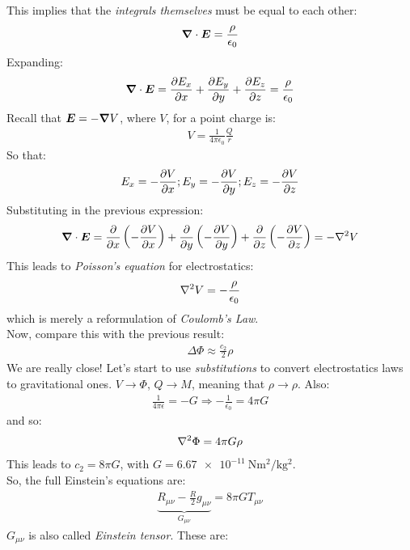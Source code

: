\documentclass[../template.tex]{subfiles}
\begin{document}
This implies that the \textit{integrals themselves} must be equal to each other:
\begin{align*}
    \vnabla \cdot \bm{E} = \frac{\rho}{\epsilon_0} 
\end{align*}
Expanding:
\begin{align*}
    \vnabla \cdot \bm{E} = \pdv{E_x}{x} + \pdv{E_y}{y} + \pdv{E_z}{z} = \frac{\rho}{\epsilon_0} 
\end{align*}
Recall that $\bm{E} = -\vnabla V$, where $V$, for a point charge is:
\begin{align*}
    V = \frac{1}{4 \pi \epsilon_0} \frac{Q}{r}  
\end{align*}  
So that:
\begin{align*}
    E_x = -\pdv{V}{x}; E_y=-\pdv{V}{y}; E_z = -\pdv{V}{z}
\end{align*}
Substituting in the previous expression:
\begin{align*}
    \vnabla \cdot \bm{E} = \pdv{x}\left(-\pdv{V}{x}\right)  + \pdv{y}\left(-\pdv{V}{y}\right) + \pdv{z}\left(-\pdv{V}{z}\right) = -\laplacian V
\end{align*}
This leads to \textit{Poisson's equation} for electrostatics:
\begin{align*}
    \laplacian V = - \frac{\rho}{\epsilon_0} 
\end{align*} 
which is merely a reformulation of \textit{Coulomb's Law}.\\
Now, compare this with the previous result:
\begin{align*}
    \Delta \Phi \approx \frac{c_2}{2} \rho 
\end{align*} 
We are really close! Let's start to use \textit{substitutions} to convert electrostatics laws to gravitational ones. $V \to \Phi$, $Q \to M$, meaning that $\rho \to \rho$. Also:
\begin{align*}
    \frac{1}{4 \pi \epsilon} = -G \Rightarrow -\frac{1}{\epsilon_0} = 4 \pi G  
\end{align*}
and so:
\begin{align*}
    \laplacian \Phi = 4 \pi G \rho
\end{align*}    
This leads to $c_2 = 8 \pi G$, with $G = \SI{6.67e-11}{\N \m\squared \per \kilo\g\squared}$.\\
So, the full Einstein's equations are:
\begin{align*}
    \underbrace{R_{\mu \nu} - \frac{R}{2} g_{\mu \nu}}_{G_{\mu \nu}}  = 8 \pi G T_{\mu \nu} 
\end{align*} 
$G_{\mu \nu}$ is also called \textit{Einstein tensor}. These are:
\end{document}
